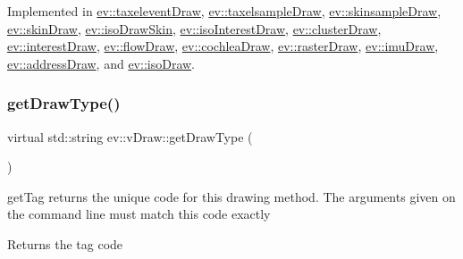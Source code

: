Implemented in \hyperlink{classev_1_1taxeleventDraw_ad2ff0348ee1b362e3c50508ffefdf9d1}{ev\+::taxelevent\+Draw}, \hyperlink{classev_1_1taxelsampleDraw_a43e40e8cfc4ed342f8d616eb9ddecf0a}{ev\+::taxelsample\+Draw}, \hyperlink{classev_1_1skinsampleDraw_a1c2492038e7fe94fe88d2286ac18f2c6}{ev\+::skinsample\+Draw}, \hyperlink{classev_1_1skinDraw_a4cbf578dd04c6a634c8959fea7295060}{ev\+::skin\+Draw}, \hyperlink{classev_1_1isoDrawSkin_a2d4ed05b06bea443974f5b07a4d69374}{ev\+::iso\+Draw\+Skin}, \hyperlink{classev_1_1isoInterestDraw_a3276f946c09d4cd0009f8379ea24d409}{ev\+::iso\+Interest\+Draw}, \hyperlink{classev_1_1clusterDraw_aa70978bb98c7bde912eb03288f21cbb5}{ev\+::cluster\+Draw}, \hyperlink{classev_1_1interestDraw_aeca2c7248d34d6817e853aad6a254380}{ev\+::interest\+Draw}, \hyperlink{classev_1_1flowDraw_a15d97ddaf93734a912be64fb60977ee2}{ev\+::flow\+Draw}, \hyperlink{classev_1_1cochleaDraw_a2b06c53991065506fcdaa9afec8282af}{ev\+::cochlea\+Draw}, \hyperlink{classev_1_1rasterDraw_a0cc698fe53b645a8a1ed8cdb40c8b7a9}{ev\+::raster\+Draw}, \hyperlink{classev_1_1imuDraw_addbaf0eff95fe6e791ca53c36218267e}{ev\+::imu\+Draw}, \hyperlink{classev_1_1addressDraw_a9ff5e558766f8b6cec2b11a60907b455}{ev\+::address\+Draw}, and \hyperlink{classev_1_1isoDraw_ad481b618ae2d08664481ffc4b3c4dd95}{ev\+::iso\+Draw}.

\mbox{\label{classev_1_1vDraw_ac01381befeffef2b930cbceb28b18a28}} 
\subsubsection{\texorpdfstring{get\+Draw\+Type()}{getDrawType()}}
{\footnotesize\ttfamily virtual std\+::string ev\+::v\+Draw\+::get\+Draw\+Type (\begin{DoxyParamCaption}{ }\end{DoxyParamCaption})\hspace{0.3cm}{\ttfamily [pure virtual]}}



get\+Tag returns the unique code for this drawing method. The arguments given on the command line must match this code exactly 

\begin{DoxyReturn}{Returns}
the tag code 
\end{DoxyReturn}


